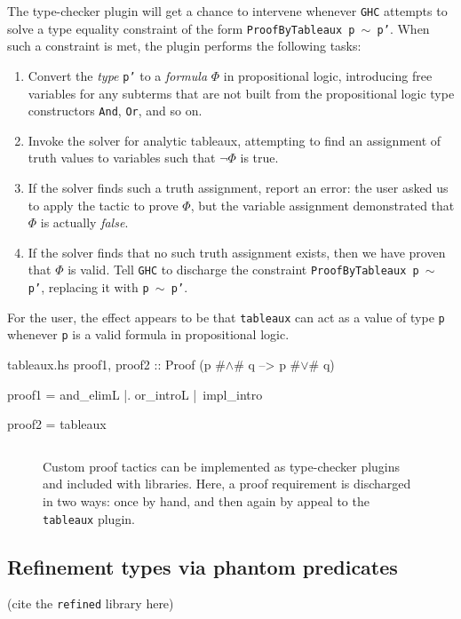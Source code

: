 \documentclass[format=sigplan, review=false, screen=true]{acmart}
\begin{document}
The type-checker plugin will get a chance to intervene whenever \texttt{GHC}
attempts to solve a type equality constraint of the form \texttt{ProofByTableaux p $\sim$ p'}.
When such a constraint is met, the plugin performs the following tasks:
\begin{enumerate}
\item Convert the \emph{type} \texttt{p'} to a \emph{formula} $\Phi$ in propositional
  logic, introducing free variables for any subterms that are not built from the
  propositional logic type constructors \texttt{And}, \texttt{Or}, and so on.
\item Invoke the solver for analytic tableaux, attempting to find an assignment of truth
  values to variables such that $\neg \Phi$ is true.
\item If the solver finds such a truth assignment, report an error: the user asked us
  to apply the tactic to prove $\Phi$, but the variable assignment demonstrated that
  $\Phi$ is actually \emph{false}.
\item If the solver finds that no such truth assignment exists, then we have proven that
  $\Phi$ is valid. Tell \texttt{GHC} to discharge the constraint \texttt{ProofByTableaux p $\sim$ p'}, replacing it with \texttt{p $\sim$ p'}.
\end{enumerate}
For the user, the effect appears to be that \texttt{tableaux} can act as a value of
type \texttt{p} whenever \texttt{p} is a valid formula in propositional logic.

\begin{filecontents*}{tableaux.hs}
proof1, proof2 :: Proof (p #$\wedge$# q --> p #$\vee$# q)
  
proof1 =  and_elimL
       |. or_introL
       |\ impl_intro

proof2 = tableaux
\end{filecontents*}

\begin{figure}
  \inputminted{haskell}{tableaux.hs}
  \caption{Custom proof tactics can be implemented as type-checker plugins and
    included with libraries. Here, a proof requirement is discharged in two ways:
    once by hand, and then again by appeal to the \texttt{tableaux} plugin.
    \label{tableaux-example}}
\end{figure}

\subsection{Refinement types via phantom predicates}

(cite the \texttt{refined} library here) \cite{refined}




  
\end{document}
